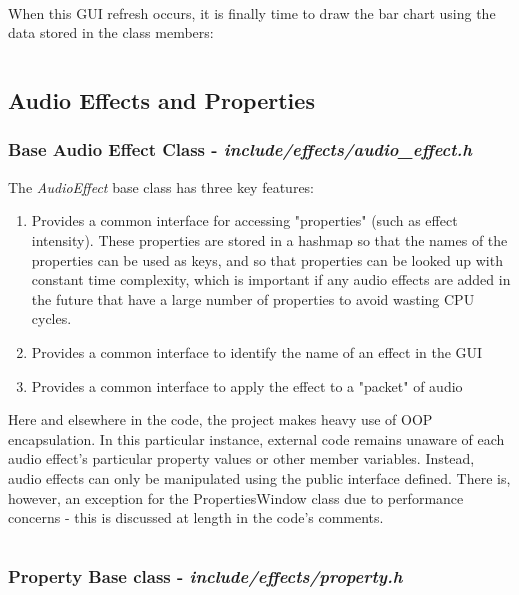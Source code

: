 \paragraph{}
When this GUI refresh occurs, it is finally time to draw the bar chart using the data stored in the class members:
\inputminted[linenos, firstline=67, lastline=131]{c++}{../src/ui/audio_visualiser.cpp}

\pagebreak
\subsection{Audio Effects and Properties}

\subsubsection{Base Audio Effect Class - \textit{include/effects/audio\_effect.h}}
The \textit{AudioEffect} base class has three key features:
\begin{enumerate}
	\item Provides a common interface for accessing "properties" (such as effect intensity). These properties are stored in a hashmap so that the names of the properties can be used as keys, and so that properties can be looked up with constant time complexity, which is important if any audio effects are added in the future that have a large number of properties to avoid wasting CPU cycles.
	\item Provides a common interface to identify the name of an effect in the GUI
	\item Provides a common interface to apply the effect to a "packet" of audio
\end{enumerate}

Here and elsewhere in the code, the project makes heavy use of OOP encapsulation. In this particular instance, external code remains unaware of each audio effect's particular property values or other member variables. Instead, audio effects can only be manipulated using the public interface defined. There is, however, an exception for the PropertiesWindow class due to performance concerns - this is discussed at length in the code's comments.    

\pagebreak
\inputminted[linenos]{c++}{../include/effects/audio_effect.h}

\pagebreak
\subsubsection{Property Base class - \textit{include/effects/property.h}}
\inputminted[linenos]{c++}{../include/effects/property.h}

